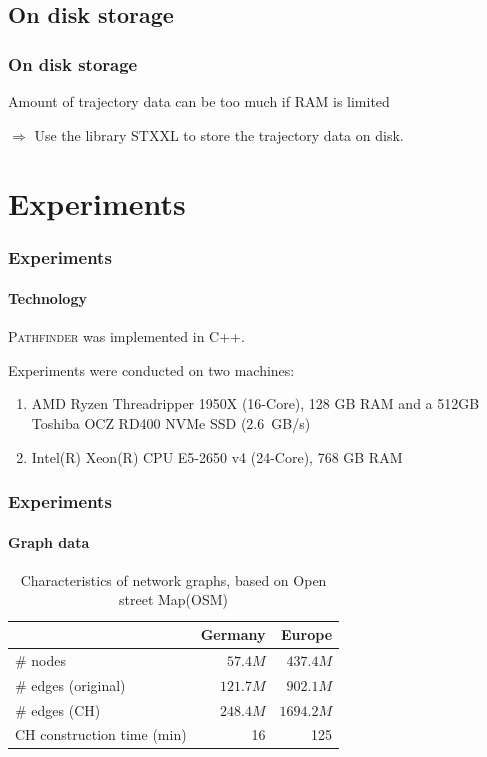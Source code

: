\documentclass{beamer}
\newcommand{\pathfinder}{\textsc{Pathfinder}\xspace}
\begin{document}
\subsection{On disk storage}
\begin{frame}
	\frametitle{On disk storage}
	Amount of trajectory data can be too much if RAM is limited \pause

	$\Rightarrow$ Use the library STXXL to store the trajectory data on disk.
\end{frame}

\section{Experiments}

\begin{frame}
	\frametitle{Experiments}
	\framesubtitle{Technology}
	\pathfinder was implemented in C++. \pause
	\medskip

	Experiments were conducted on two machines:
	\begin{enumerate}
		\item AMD Ryzen Threadripper 1950X (16-Core), 128 GB RAM and a 512GB Toshiba OCZ RD400 NVMe SSD (\SI{2.6}{GB}/s)  %
		\item Intel(R) Xeon(R) CPU E5-2650 v4 (24-Core), 768 GB RAM %
	\end{enumerate}
\end{frame}

\begin{frame}
	\frametitle{Experiments}
	\framesubtitle{Graph data}
	\begin{table}
		{
			\caption{Characteristics of network graphs, based on Open street Map(OSM)}
			\begin{tabular}{|l|rr|}
				\hline
				                           & Germany  & Europe
				\\ \hline
				\# nodes                   & $57.4M$  & $437.4M$  \\
				\# edges (original)        & $121.7M$ & $902.1M$  \\
				\# edges (CH)              & $248.4M$ & $1694.2M$ \\
				CH construction time (min) & 16       & 125       \\
				\hline
			\end{tabular}
		}
	\end{table}
\end{frame}
\end{document}
